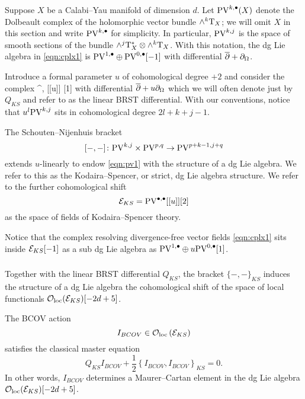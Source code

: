 \documentclass[11pt]{amsart}
\begin{document}
Suppose $X$ be a Calabi--Yau manifold of dimension $d$. 
Let ${\rm PV}^{k,\bullet}(X)$ denote the Dolbeault complex of the holomorphic vector bundle $\wedge^k {\rm T}_X$; we will omit $X$ in this section and write ${\rm PV}^{k,\bullet}$ for simplicity.
In particular, ${\rm PV}^{k,j}$ is the space of smooth sections of the bundle $\wedge^j {\rm T}_X^* \otimes \wedge^k {\rm T}_X$. 
With this notation, the dg Lie algebra in \eqref{eqn:cplx1} is ${\rm PV}^{1,\bullet} \oplus {\rm PV}^{0,\bullet}[-1]$ with differential $\overline{\partial} + \partial_{\Omega}$. 

Introduce a formal parameter $u$ of cohomological degree $+2$ and consider the complex 
\beqn\label{eqn:pv1}
\PV^{\bu,\bu} [[u]] [1]
\eeqn
with differential $\overline{\partial} + u \partial_{\Omega}$ which we will often denote just by $Q_{KS}$ and refer to as the linear BRST differential. 
With our conventions, notice that $u^l {\rm PV}^{k,j}$ sits in cohomological degree $2l +k + j - 1$. 

The Schouten--Nijenhuis bracket 
\[
[-,-] \colon {\rm PV}^{k,j} \times {\rm PV}^{p,q} \to {\rm PV}^{p+k-1,j+q} 
\]
extends $u$-linearly to endow \eqref{eqn:pv1} with the structure of a dg Lie algebra.
We refer to this as the Kodaira--Spencer, or strict, dg Lie algebra structure.
We refer to the further cohomological shift 
\[
\mathcal E_{KS} = {\rm PV}^{\bullet,\bullet} [[u]] [2]
\]
as the space of fields of Kodaira--Spencer theory.

Notice that the complex resolving divergence-free vector fields \eqref{eqn:cplx1} sits inside $\mathcal E_{KS} [-1]$ as a sub dg Lie algebra as ${\rm PV}^{1,\bullet} \oplus u {\rm PV}^{0,\bullet}[1]$. 

\subsubsection{}


\subsubsection{}

Together with the linear BRST differential $Q_{KS}$, the bracket $\{-,-\}_{KS}$ induces the structure of a dg Lie algebra the cohomological shift of the space of local functionals ${\mathcal O}_{\rm loc}(\mathcal E_{KS})[-2d+5]$. 

\begin{thm}
The BCOV action 
\[
I_{BCOV} \in {\mathcal O}_{\rm loc} \left(\mathcal E_{KS} \right) 
\]
satisfies the classical master equation 
\[
Q_{KS} I_{BCOV} + \frac12 \left\{I_{BCOV}, I_{BCOV}\right\}_{KS} = 0 .
\]
In other words, $I_{BCOV}$ determines a Maurer--Cartan element in the dg Lie algebra ${\mathcal O}_{\rm loc}(\mathcal E_{KS})[-2d+5]$.
\end{thm}
\end{document}
